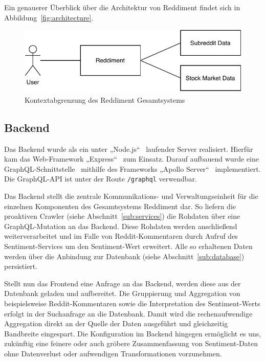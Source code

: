 \documentclass[a4paper, 10pt, conference]{IEEEtran}
\begin{document}
Ein genauerer Überblick über die Architektur von Reddiment findet sich in Abbildung~\ref{fig:architecture}.

\begin{figure}[ht]
	\centering
	\includegraphics[width=\linewidth]{context}
	\caption{Kontextabgrenzung des Reddiment Gesamtsystems}
	\label{fig:context}
\end{figure}

\subsection{Backend} \label{sub:backend}
Das Backend wurde als ein unter „Node.js“~\cite{node} laufender Server realisiert. Hierfür kam das Web-Framework „Express“~\cite{express} zum Einsatz. Darauf aufbauend wurde eine GraphQL-Schnittstelle~\cite{graphql} mithilfe des Frameworks „Apollo Server“~\cite{apolloserver} implementiert. Die GraphQL-API ist unter der Route \texttt{/graphql} verwendbar.

Das Backend stellt die zentrale Kommunikations- und Verwaltungseinheit für die einzelnen Komponenten des Gesamtsystems Reddiment dar. So liefern die proaktiven Crawler (siehe Abschnitt~\ref{sub:services}) die Rohdaten über eine GraphQL-Mutation an das Backend. Diese Rohdaten werden anschließend weiterverarbeitet und im Falle von Reddit-Kommentaren durch Aufruf des Sentiment-Services um den Sentiment-Wert erweitert. Alle so erhaltenen Daten werden über die Anbindung zur Datenbank (siehe Abschnitt~\ref{sub:database}) persistiert.

Stellt nun das Frontend eine Anfrage an das Backend, werden diese aus der Datenbank geladen und aufbereitet. Die Gruppierung und Aggregation von beispielsweise Reddit-Kommentaren sowie die Interpretation des Sentiment-Werts erfolgt in der Suchanfrage an die Datenbank. Damit wird die rechenaufwendige Aggregation direkt an der Quelle der Daten ausgeführt und gleichzeitig Bandbreite eingespart. Die Konfiguration im Backend hingegen ermöglicht es uns, zukünftig eine feinere oder auch gröbere Zusammenfassung von Sentiment-Daten ohne Datenverlust oder aufwendigen Transformationen vorzunehmen.
\end{document}
